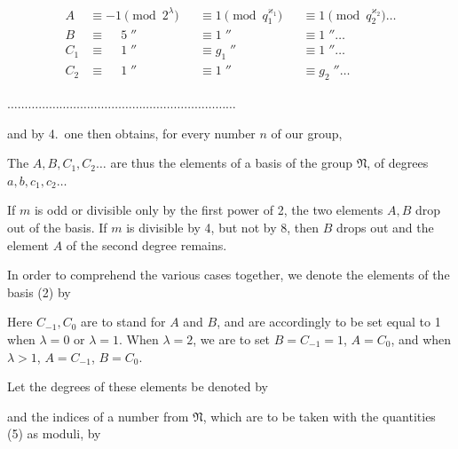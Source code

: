 \[
\begin{aligned}
A &\equiv -1 \pmod{2^{\lambda}} &&\equiv 1 \pmod{q_1^{\varkappa_1}} &&\equiv 1 \pmod{q_2^{\varkappa_2}} \ldots\\
B &\equiv \phantom{-}5\;'' &&\equiv 1\;'' &&\equiv 1\;'' \ldots\\
C_1 &\equiv \phantom{-}1\;'' &&\equiv g_1\;'' &&\equiv 1\;'' \ldots\\
C_2 &\equiv \phantom{-}1\;'' &&\equiv 1\;'' &&\equiv g_2\;'' \ldots
\end{aligned}
\]

\noindent
$\ldots\ldots\ldots\ldots\ldots\ldots\ldots\ldots\ldots\ldots\ldots\ldots\ldots\ldots\ldots\ldots\ldots\ldots\ldots\ldots\ldots\ldots$

and by 4.\ one then obtains, for every number $n$ of our group,


The $A, B, C_1, C_2 \ldots$ are thus the elements of a basis of the
group $\mathfrak{N}$, of degrees $a, b, c_1, c_2 \ldots$

If $m$ is odd or divisible only by the first power of 2,
the two elements $A, B$ drop out of the basis. If $m$ is divisible
by 4, but not by 8, then $B$ drops out and the element $A$ of the
second degree remains.


In order to comprehend the various cases together, we denote
the elements of the basis (2) by


Here $C_{-1}, C_0$ are to stand for $A$ and $B$, and are accordingly
to be set equal to 1 when $\lambda = 0$ or $\lambda = 1$. When $\lambda = 2$,
we are to set $B = C_{-1} = 1$, $A = C_0$, and when $\lambda > 1$, $A = C_{-1}$,
$B = C_0$.

Let the degrees of these elements be denoted by


and the indices of a number from $\mathfrak{N}$, which are to be taken with
the quantities (5) as moduli, by


